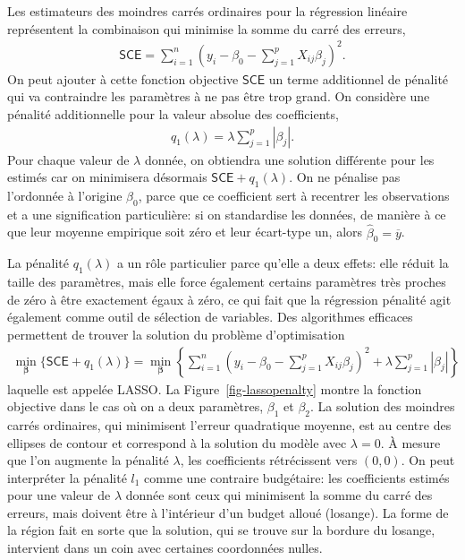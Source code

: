 \documentclass[
  11pt,
  letterpaper,
]{scrbook}
\theoremstyle{definition}
\theoremstyle{remark}
\begin{document}
Les estimateurs des moindres carrés ordinaires pour la régression
linéaire représentent la combinaison qui minimise la somme du carré des
erreurs, \begin{align*}
\mathsf{SCE} = \sum_{i=1}^n \left(y_i - \beta_0 - \sum_{j=1}^pX_{ij}\beta_{j}\right)^2.
\end{align*} On peut ajouter à cette fonction objective \(\mathsf{SCE}\)
un terme additionnel de pénalité qui va contraindre les paramètres à ne
pas être trop grand. On considère une pénalité additionnelle pour la
valeur absolue des coefficients, \begin{align*}
q_1(\lambda) = \lambda \sum_{j=1}^p |\beta_j|.
\end{align*} Pour chaque valeur de \(\lambda\) donnée, on obtiendra une
solution différente pour les estimés car on minimisera désormais
\(\mathsf{SCE} + q_1(\lambda)\). On ne pénalise pas l'ordonnée à
l'origine \(\beta_0\), parce que ce coefficient sert à recentrer les
observations et a une signification particulière: si on standardise les
données, de manière à ce que leur moyenne empirique soit zéro et leur
écart-type un, alors \(\widehat{\beta}_0 = \overline{y}\).

La pénalité \(q_1(\lambda)\) a un rôle particulier parce qu'elle a deux
effets: elle réduit la taille des paramètres, mais elle force également
certains paramètres très proches de zéro à être exactement égaux à zéro,
ce qui fait que la régression pénalité agit également comme outil de
sélection de variables. Des algorithmes efficaces permettent de trouver
la solution du problème d'optimisation \begin{align*}
\min_{\boldsymbol{\beta}} \{\mathsf{SCE} + q_1(\lambda)\} = \min_{\boldsymbol{\beta}}  \left\{\sum_{i=1}^n \left(y_i - \beta_0 - \sum_{j=1}^pX_{ij}\beta_{j}\right)^2 +
\lambda \sum_{j=1}^p |\beta_j|\right\}
\end{align*} laquelle est appelée LASSO. La
Figure~\ref{fig-lassopenalty} montre la fonction objective dans le cas
où on a deux paramètres, \(\beta_1\) et \(\beta_2\). La solution des
moindres carrés ordinaires, qui minimisent l'erreur quadratique moyenne,
est au centre des ellipses de contour et correspond à la solution du
modèle avec \(\lambda=0\). À mesure que l'on augmente la pénalité
\(\lambda\), les coefficients rétrécissent vers \((0, 0)\). On peut
interpréter la pénalité \(l_1\) comme une contraire budgétaire: les
coefficients estimés pour une valeur de \(\lambda\) donnée sont ceux qui
minimisent la somme du carré des erreurs, mais doivent être à
l'intérieur d'un budget alloué (losange). La forme de la région fait en
sorte que la solution, qui se trouve sur la bordure du losange,
intervient dans un coin avec certaines coordonnées nulles.
\end{document}
